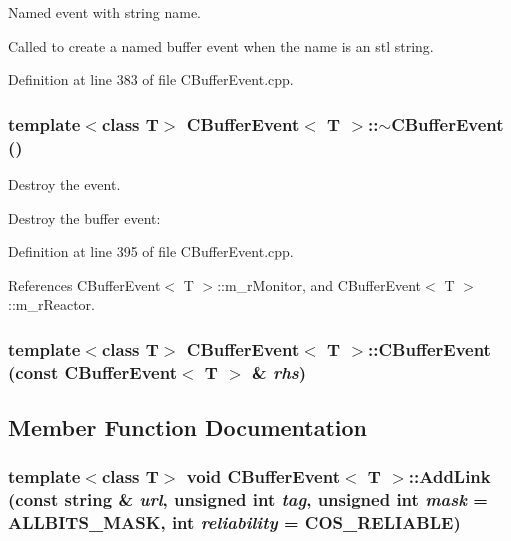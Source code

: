 Named event with string name.

Called to create a named buffer event when the name is an stl string. 

Definition at line 383 of file CBuffer\-Event.cpp.
\subsubsection{\setlength{\rightskip}{0pt plus 5cm}template$<$class T$>$ CBuffer\-Event$<$ T $>$::$\sim$CBuffer\-Event ()}\label{classCBufferEvent_a3}


Destroy the event.

Destroy the buffer event: 

Definition at line 395 of file CBuffer\-Event.cpp.

References CBuffer\-Event$<$ T $>$::m\_\-r\-Monitor, and CBuffer\-Event$<$ T $>$::m\_\-r\-Reactor.
\subsubsection{\setlength{\rightskip}{0pt plus 5cm}template$<$class T$>$ CBuffer\-Event$<$ T $>$::CBuffer\-Event (const CBuffer\-Event$<$ T $>$ \& {\em rhs})\hspace{0.3cm}{\tt  [private]}}\label{classCBufferEvent_c0}




\subsection{Member Function Documentation}
\subsubsection{\setlength{\rightskip}{0pt plus 5cm}template$<$class T$>$ void CBuffer\-Event$<$ T $>$::Add\-Link (const string \& {\em url}, unsigned int {\em tag}, unsigned int {\em mask} = ALLBITS\_\-MASK, int {\em reliability} = COS\_\-RELIABLE)}\label{classCBufferEvent_a8}


